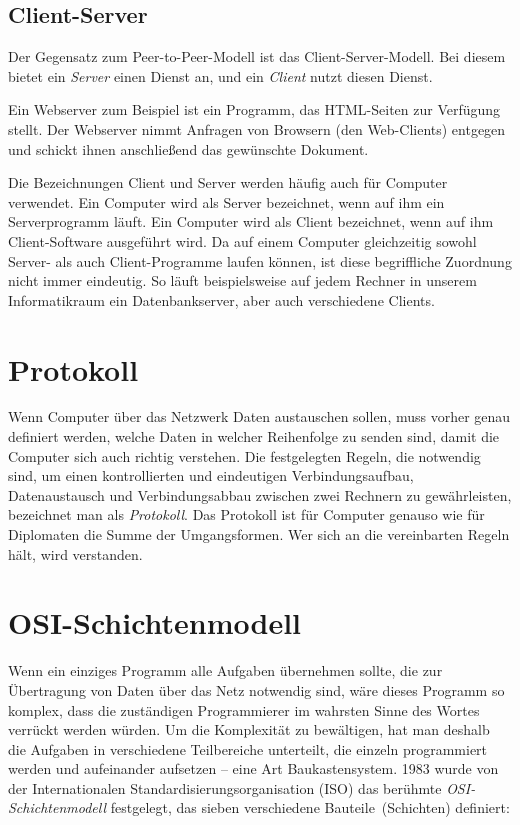 \subsection{Client-Server}

Der Gegensatz zum Peer-to-Peer-Modell ist das Client-Server-Modell. Bei diesem
bietet ein \emph{Server} einen Dienst an, und ein \emph{Client} nutzt diesen
Dienst.

Ein Webserver zum Beispiel ist ein Programm, das HTML-Seiten zur Verfügung
stellt. Der Webserver nimmt Anfragen von Browsern (den Web-Clients) entgegen
und schickt ihnen anschließend das gewünschte Dokument.

Die Bezeichnungen Client und Server werden häufig auch für Computer verwendet.
Ein Computer wird als Server bezeichnet, wenn auf ihm ein Serverprogramm
läuft. Ein Computer wird als Client bezeichnet, wenn auf ihm Client-Software
ausgeführt wird. Da auf einem Computer gleichzeitig sowohl Server- als auch
Client-Programme laufen können, ist diese begriffliche Zuordnung nicht immer
eindeutig. So läuft beispielsweise auf jedem Rechner in unserem Informatikraum
ein Datenbankserver, aber auch verschiedene Clients.


\section{Protokoll}

Wenn Computer über das Netzwerk Daten austauschen sollen, muss vorher genau
definiert werden, welche Daten in welcher Reihenfolge zu senden sind, damit
die Computer sich auch richtig verstehen. Die festgelegten Regeln, die
notwendig sind, um einen kontrollierten und eindeutigen Verbindungsaufbau,
Datenaustausch und Verbindungsabbau zwischen zwei Rechnern zu gewährleisten,
bezeichnet man als \emph{Protokoll}. Das Protokoll ist für Computer genauso wie
für Diplomaten die Summe der Umgangsformen. Wer sich an die vereinbarten Regeln
hält, wird verstanden.


\section{OSI-Schichtenmodell}

Wenn ein einziges Programm alle Aufgaben übernehmen sollte, die zur Übertragung
von Daten über das Netz notwendig sind, wäre dieses Programm so komplex, dass
die zuständigen Programmierer im wahrsten Sinne des Wortes verrückt werden
würden. Um die Komplexität zu bewältigen, hat man deshalb die Aufgaben in
verschiedene Teilbereiche unterteilt, die einzeln programmiert werden und
aufeinander aufsetzen -- eine Art \glqq Baukastensystem\grqq . 1983 wurde von
der Internationalen Standardisierungsorganisation (ISO) das berühmte
\emph{OSI-Schichtenmodell} festgelegt, das sieben verschiedene \glqq
Bauteile\grqq\ (Schichten) definiert:

